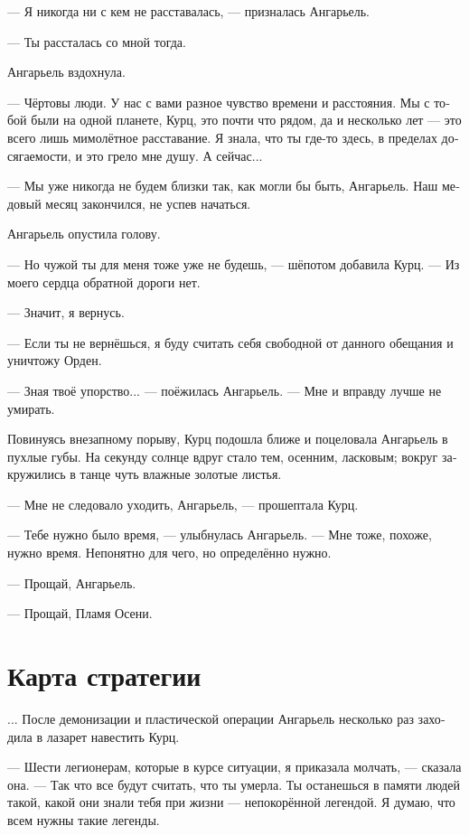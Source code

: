 \documentclass[a4paper,12pt,fleqn]{book}\usepackage{polyglossia}\setdefaultlanguage[babelshorthands=true]{russian}\setotherlanguage{english}\defaultfontfeatures{Ligatures=TeX,Mapping=tex-text}\usepackage{xcolor}\newcommand{\ml}[3]{#2}
\begin{document}
--- Я никогда ни с кем не расставалась, --- призналась Ангарьель.

--- Ты рассталась со мной тогда.

Ангарьель вздохнула.

--- Чёртовы люди.
У нас с вами разное чувство времени и расстояния.
Мы с тобой были на одной планете, Курц, это почти что рядом, да и несколько лет --- это всего лишь мимолётное расставание.
Я знала, что ты где-то здесь, в пределах досягаемости, и это грело мне душу.
А сейчас...

--- Мы уже никогда не будем близки так, как могли бы быть, Ангарьель.
Наш медовый месяц закончился, не успев начаться.

Ангарьель опустила голову.

--- Но чужой ты для меня тоже уже не будешь, --- шёпотом добавила Курц.
\ml{$0$}
{--- Из моего сердца обратной дороги нет.}
{``There's no way back from my heart.''}

--- Значит, я вернусь.

--- Если ты не вернёшься, я буду считать себя свободной от данного обещания и уничтожу Орден.

--- Зная твоё упорство... --- поёжилась Ангарьель.
--- Мне и вправду лучше не умирать.

Повинуясь внезапному порыву, Курц подошла ближе и поцеловала Ангарьель в пухлые губы.
На секунду солнце вдруг стало тем, осенним, ласковым;
вокруг закружились в танце чуть влажные золотые листья.

--- Мне не следовало уходить, Ангарьель, --- прошептала Курц.

--- Тебе нужно было время, --- улыбнулась Ангарьель.
--- Мне тоже, похоже, нужно время.
Непонятно для чего, но определённо нужно.

--- Прощай, Ангарьель.

--- Прощай, Пламя Осени.

\section{Карта стратегии}

... После демонизации и пластической операции Ангарьель несколько раз заходила в лазарет навестить Курц.

--- Шести легионерам, которые в курсе ситуации, я приказала молчать, --- сказала она.
--- Так что все будут считать, что ты умерла.
Ты останешься в памяти людей такой, какой они знали тебя при жизни --- непокорённой легендой.
Я думаю, что всем нужны такие легенды.
\end{document}
